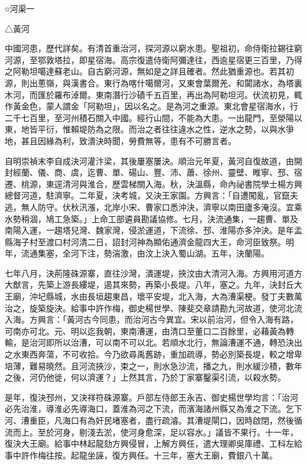 
\begin{pinyinscope}
○河渠一

△黃河

中國河患，歷代詳矣。有清首重治河，探河源以窮水患。聖祖初，命侍衛拉錫往窮河源，至鄂敦塔拉，即星宿海。高宗復遣侍衛阿彌達往，西逾星宿更三百里，乃得之阿勒坦噶達蘇老山。自古窮河源，無如是之詳且確者。然此猶重源也。若其初源，則出蔥嶺，與漢書合。東行為喀什噶爾河，又東會葉爾羌、和闐諸水，為塔裏木河，而匯於羅布淖爾。東南潛行沙磧千五百里，再出為阿勒坦河。伏流初見，輒作黃金色，蒙人謂金「阿勒坦」，因以名之。是為河之重源。東北會星宿海水，行二千七百里，至河州積石關入中國。經行山間，不能為大患。一出龍門，至滎陽以東，地皆平衍，惟賴堤防為之限。而治之者往往違水之性，逆水之勢，以與水爭地，甚且因緣為利，致潰決時聞，勞費無等，患有不可勝言者。

自明崇禎末李自成決河灌汴梁，其後屢塞屢決。順治元年夏，黃河自復故道，由開封經蘭、儀、商、虞，迄曹、單、碭山、豐、沛、蕭、徐州、靈壁、睢寧、邳、宿遷、桃源，東逕清河與淮合，歷雲梯關入海。秋，決溫縣，命內祕書院學士楊方興總督河道，駐濟寧。二年夏，決考城，又決王家園。方興言：「自遭闖亂，官竄夫逃，無人防守。伏秋汛漲，北岸小宋、曹家口悉沖決，濟寧以南田廬多淹沒。宜乘水勢稍涸，鳩工急築。」上命工部遴員勘議協修。七月，決流通集，一趨曹、單及南陽入運，一趨塔兒灣、魏家灣，侵淤運道，下流徐、邳、淮陽亦多沖決。是年孟縣海子村至渡口村河清二日，詔封河神為顯佑通濟金龍四大王，命河臣致祭。明年，流通集塞，全河下注，勢湍激，由汶上決入蜀山湖。五年，決蘭陽。

七年八月，決荊隆硃源寨，直往沙灣，潰運堤，挾汶由大清河入海。方興用河道方大猷言，先築上游長縷堤，遏其來勢，再築小長堤。八年，塞之。九年，決封丘大王廟，沖圮縣城，水由長垣趨東昌，壞平安堤，北入海，大為漕渠梗。發丁夫數萬治之，旋築旋決。給事中許作梅，御史楊世學、陳斐交章請勘九河故道，使河北流入海。方興言：「黃河古今同患，而治河古今異宜。宋以前治河，但令入海有路，可南亦可北。元、明以迄我朝，東南漕運，由清口至董口二百餘里，必藉黃為轉輸，是治河即所以治漕，可以南不可以北。若順水北行，無論漕運不通，轉恐決出之水東西奔蕩，不可收拾。今乃欲尋禹舊跡，重加疏導，勢必別築長堤，較之增卑培薄，難易曉然。且河流挾沙，束之一，則水急沙流，播之九，則水緩沙積，數年之後，河仍他徙，何以濟運？」上然其言，乃於丁家寨鑿渠引流，以殺水勢。

是年，復決邳州，又決祥符硃源寨。戶部左侍郎王永吉、御史楊世學均言：「治河必先治淮，導淮必先導海口，蓋淮為河之下流，而濱海諸州縣又為淮之下流。乞下河、漕重臣，凡海口有為奸民堵塞者，盡行疏濬。其漕堤閘口，因時啟閉，然後循流而上。至於河身，剔淺去淤，使河身愈深，足以容水。」議皆不果行。十一年，復決大王廟。給事中林起龍劾方興侵冒，上解方興任，遣大理卿吳庫禮、工科左給事中許作梅往按。起龍坐誣，復方興任。十三年，塞大王廟，費銀八十萬。


\end{pinyinscope}

